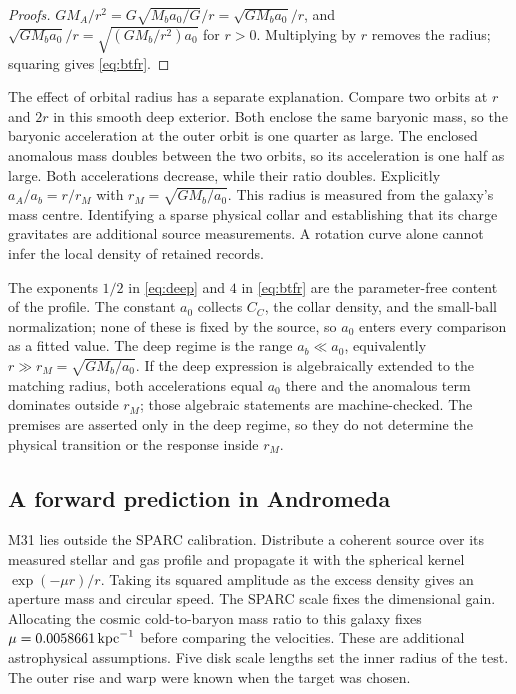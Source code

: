 \documentclass[11pt]{article}
\begin{document}
\begin{proof}[Proofs]
\(GM_A/r^2=G\sqrt{M_ba_0/G}/r=\sqrt{GM_ba_0}/r\), and
\(\sqrt{GM_ba_0}/r=\sqrt{(GM_b/r^2)a_0}\) for \(r>0\). Multiplying by \(r\)
removes the radius; squaring gives \eqref{eq:btfr}.
\end{proof}

The effect of orbital radius has a separate explanation. Compare two
orbits at $r$ and $2r$ in this smooth deep exterior. Both enclose the
same baryonic mass, so the baryonic acceleration at the outer orbit
is one quarter as large. The enclosed anomalous mass doubles between
the two orbits, so its acceleration is one half as large. Both
accelerations decrease, while their ratio doubles. Explicitly
$a_A/a_b=r/r_M$ with $r_M=\sqrt{GM_b/a_0}$. This radius is measured
from the galaxy's mass centre. Identifying a sparse physical collar
and establishing that its charge gravitates are additional source
measurements. A rotation curve alone cannot infer the local density of
retained records.

The exponents \(1/2\) in \eqref{eq:deep} and \(4\) in \eqref{eq:btfr} are
the parameter-free content of the profile. The constant \(a_0\) collects
\(C_C\), the collar density, and the small-ball normalization; none of these
is fixed by the source, so \(a_0\) enters every comparison as a fitted
value. The deep regime is the range \(a_b\ll a_0\), equivalently
\(r\gg r_M=\sqrt{GM_b/a_0}\). If the deep expression is algebraically
extended to the matching radius, both accelerations equal \(a_0\) there and
the anomalous term dominates outside \(r_M\); those algebraic statements are
machine-checked. The premises are asserted only in the deep regime, so they
do not determine the physical transition or the response inside \(r_M\).

\subsection{A forward prediction in Andromeda}

M31 lies outside the SPARC calibration. Distribute a coherent source over
its measured stellar and gas profile and propagate it with the spherical
kernel $\exp(-\mu r)/r$. Taking its squared amplitude as the excess
density gives an aperture mass and circular speed. The SPARC scale fixes
the dimensional gain. Allocating the cosmic cold-to-baryon mass ratio to
this galaxy fixes $\mu=0.0058661\,{\rm kpc}^{-1}$ before comparing the
velocities. These are additional astrophysical assumptions. Five disk
scale lengths set the inner radius of the test. The outer rise and warp
were known when the target was chosen.
\end{document}
